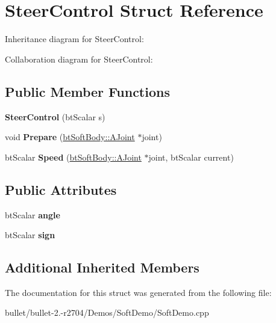 \hypertarget{struct_steer_control}{\section{Steer\+Control Struct Reference}
\label{struct_steer_control}
}


Inheritance diagram for Steer\+Control\+:


Collaboration diagram for Steer\+Control\+:
\subsection*{Public Member Functions}
\begin{DoxyCompactItemize}
\item 
\hypertarget{struct_steer_control_a65f331a85db61db78d175a4d3da06632}{{\bfseries Steer\+Control} (bt\+Scalar s)}\label{struct_steer_control_a65f331a85db61db78d175a4d3da06632}

\item 
\hypertarget{struct_steer_control_a563b4140435625017a4572de2c653cae}{void {\bfseries Prepare} (\hyperlink{structbt_soft_body_1_1_a_joint}{bt\+Soft\+Body\+::\+A\+Joint} $\ast$joint)}\label{struct_steer_control_a563b4140435625017a4572de2c653cae}

\item 
\hypertarget{struct_steer_control_ac268afd2f30928603ef7abfee596d3d0}{bt\+Scalar {\bfseries Speed} (\hyperlink{structbt_soft_body_1_1_a_joint}{bt\+Soft\+Body\+::\+A\+Joint} $\ast$joint, bt\+Scalar current)}\label{struct_steer_control_ac268afd2f30928603ef7abfee596d3d0}

\end{DoxyCompactItemize}
\subsection*{Public Attributes}
\begin{DoxyCompactItemize}
\item 
\hypertarget{struct_steer_control_aa688155aff6291757f8b3f5c1f45ed47}{bt\+Scalar {\bfseries angle}}\label{struct_steer_control_aa688155aff6291757f8b3f5c1f45ed47}

\item 
\hypertarget{struct_steer_control_aaea33bcc534ecfd3724f3d82bee9e261}{bt\+Scalar {\bfseries sign}}\label{struct_steer_control_aaea33bcc534ecfd3724f3d82bee9e261}

\end{DoxyCompactItemize}
\subsection*{Additional Inherited Members}


The documentation for this struct was generated from the following file\+:\begin{DoxyCompactItemize}
\item 
bullet/bullet-\/2.-\/r2704/\+Demos/\+Soft\+Demo/Soft\+Demo.\+cpp\end{DoxyCompactItemize}
